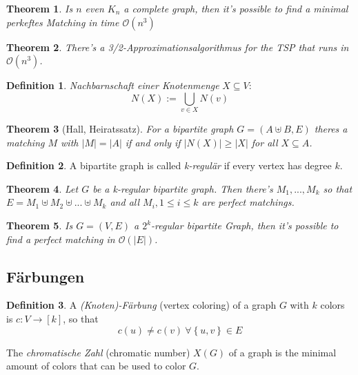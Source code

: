 \documentclass[12pt]{extarticle}
\theoremstyle{definition}
\newtheorem{definition}{Definition}
\theoremstyle{remark}
\theoremstyle{plain}
\newtheorem{theorem}{Theorem}
\newcommand{\BO}{\mathcal{O}}
\begin{document}
\begin{theorem}
    Is $n$ even $K_n$ a complete graph, then it's possible to find a \textit{minimal perkeftes Matching} in time $\BO(n^3)$
\end{theorem}

\begin{theorem}
    There's a 3/2-Approximationsalgorithmus for the TSP that runs in $\BO(n^3)$.
\end{theorem}

\begin{definition}
    \textit{Nachbarnschaft einer Knotenmenge} $X \subseteq V$:
    \[ N(X) := \bigcup_{v \in X} N(v) \]
\end{definition}

\begin{theorem}[Hall, Heiratssatz]
    For a bipartite graph $G = (A \uplus B, E)$ theres a matching $M$ with $|M| = |A|$ if and only if $|N(X)| \ge |X|$ for all $X \subseteq A$.
\end{theorem}

\begin{definition}
    A bipartite graph is called \textit{k-regulär} if every vertex has degree $k$.
\end{definition}

\begin{theorem}
    Let $G$ be a k-regular bipartite graph. Then there's $M_1, ..., M_k$ so that $E = M_1 \uplus M_2 \uplus ... \uplus M_k$ and all
    $M_i, 1 \le i \le k$ are perfect matchings.
\end{theorem}

\begin{theorem}
    Is $G = (V, E)$ a $2^k$-regular bipartite Graph, then it's possible to find a perfect matching in $\BO(|E|)$.
\end{theorem}

\subsection{Färbungen}

\begin{definition}
    A \textit{(Knoten)-Färbung} (vertex coloring) of a graph $G$ with $k$ colors is $c: V \to [k]$, so that
    \[ c(u) \ne c(v)\ \forall \left\{ u, v \right\} \in E \]

    The \textit{chromatische Zahl} (chromatic number) $X(G)$ of a graph is the minimal amount of colors that can be used to
    color $G$.
\end{definition}
\end{document}
